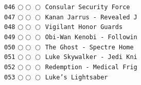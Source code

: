 \documentclass[a4paper,landscape]{article}
\begin{document}
\begin{multicols*}{5}
\texttt{046} \(\bigcirc\!\bigcirc\!\bigcirc\)  \texttt{Consular Security Force} \vspace{-0.3mm}\\ 
\texttt{047} \(\bigcirc\!\bigcirc\!\bigcirc\)  \texttt{Kanan Jarrus - Revealed J} \vspace{-0.3mm}\\ 
\texttt{048} \(\bigcirc\!\bigcirc\!\bigcirc\)  \texttt{Vigilant Honor Guards} \vspace{-0.3mm}\\ 
\texttt{049} \(\bigcirc\!\bigcirc\!\bigcirc\)  \texttt{Obi-Wan Kenobi - Followin} \vspace{-0.3mm}\\ 
\texttt{050} \(\bigcirc\!\bigcirc\!\bigcirc\)  \texttt{The Ghost - Spectre Home } \vspace{-0.3mm}\\ 
\texttt{051} \(\bigcirc\!\bigcirc\!\bigcirc\)  \texttt{Luke Skywalker - Jedi Kni} \vspace{-0.3mm}\\ 
\texttt{052} \(\bigcirc\!\bigcirc\!\bigcirc\)  \texttt{Redemption - Medical Frig} \vspace{-0.3mm}\\ 
\texttt{053} \(\bigcirc\!\bigcirc\!\bigcirc\)  \texttt{Luke's Lightsaber} \vspace{-0.3mm}\\ 

\end{multicols*}
\end{document}
